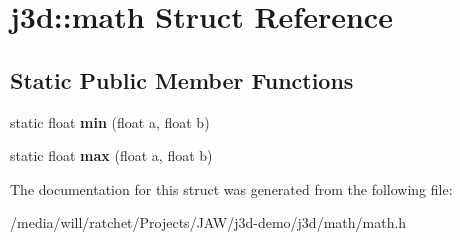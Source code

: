 \hypertarget{structj3d_1_1math}{}\section{j3d\+:\+:math Struct Reference}
\label{structj3d_1_1math}
\subsection*{Static Public Member Functions}
\begin{DoxyCompactItemize}
\item 
\hypertarget{structj3d_1_1math_a355d66b7249e52cdadff841434d255bc}{}static float {\bfseries min} (float a, float b)\label{structj3d_1_1math_a355d66b7249e52cdadff841434d255bc}

\item 
\hypertarget{structj3d_1_1math_a7787bfe471d28520d2221ea460ba0dd8}{}static float {\bfseries max} (float a, float b)\label{structj3d_1_1math_a7787bfe471d28520d2221ea460ba0dd8}

\end{DoxyCompactItemize}


The documentation for this struct was generated from the following file\+:\begin{DoxyCompactItemize}
\item 
/media/will/ratchet/\+Projects/\+J\+A\+W/j3d-\/demo/j3d/math/math.\+h\end{DoxyCompactItemize}
